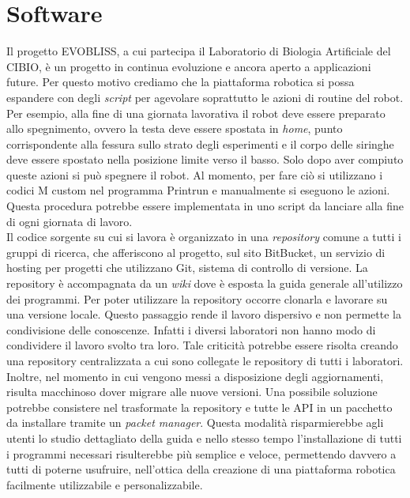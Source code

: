 \section{Software}
Il progetto EVOBLISS, a cui partecipa il Laboratorio di Biologia Artificiale del CIBIO, è un progetto in continua evoluzione e ancora aperto a applicazioni future. Per questo motivo crediamo che la piattaforma robotica si possa espandere con degli \emph{script} per agevolare soprattutto le azioni di routine del robot. Per esempio, alla fine di una giornata lavorativa il robot deve essere preparato allo spegnimento, ovvero la testa deve essere spostata in \emph{home}, punto corrispondente alla fessura sullo strato degli esperimenti e il corpo delle siringhe deve essere spostato nella posizione limite verso il basso. Solo dopo aver compiuto queste azioni si può spegnere il robot. Al momento, per fare ciò si utilizzano i codici M custom nel programma Printrun e manualmente si eseguono le azioni. Questa procedura potrebbe essere implementata in uno script da lanciare alla fine di ogni giornata di lavoro. 
\\Il codice sorgente su cui si lavora è organizzato in una \emph{repository} comune a tutti i gruppi di ricerca, che afferiscono al progetto, sul sito BitBucket\cite{repo}, un servizio di hosting per progetti che utilizzano Git, sistema di controllo di versione.
La repository è accompagnata da un \emph{wiki} dove è esposta la guida generale all'utilizzo dei programmi. Per poter utilizzare la repository occorre clonarla e lavorare su una versione locale. Questo passaggio rende il lavoro dispersivo e non permette la condivisione delle conoscenze. Infatti i diversi laboratori non hanno modo di condividere il lavoro svolto tra loro. Tale criticità potrebbe essere risolta creando una repository centralizzata a cui sono collegate le repository di tutti i laboratori.
Inoltre, nel momento in cui vengono messi a disposizione degli aggiornamenti, risulta macchinoso dover migrare alle nuove versioni. Una possibile soluzione potrebbe consistere nel trasformate la repository e tutte le API in un pacchetto da installare tramite un \emph{packet manager}. Questa modalità risparmierebbe agli utenti lo studio dettagliato della guida e nello stesso tempo l'installazione di tutti i programmi necessari risulterebbe più semplice e veloce, permettendo davvero a tutti di poterne usufruire, nell'ottica della creazione di una piattaforma robotica facilmente utilizzabile e personalizzabile. 

